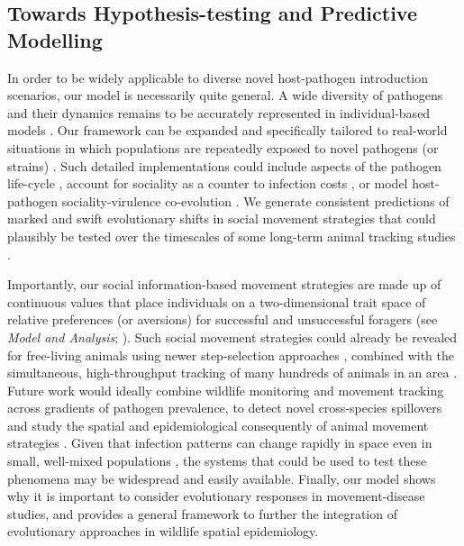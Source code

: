 \subsection*{Towards Hypothesis-testing and Predictive Modelling}

In order to be widely applicable to diverse novel host-pathogen introduction scenarios, our model is necessarily quite general.
A wide diversity of pathogens and their dynamics remains to be accurately represented in individual-based models \autocite{white2017,white2018,scherer2020,lunn2021}. 
Our framework can be expanded and specifically tailored to real-world situations in which populations are repeatedly exposed to novel pathogens (or strains) \autocite{scherer2020,wille2022,bastos2000,jolles2021,chandler2021,kuchipudi2022}.
Such detailed implementations could include aspects of the pathogen life-cycle \autocite{white2018a,white2017}, account for sociality as a counter to infection costs \autocite{ezenwa2016,almberg2015}, or model host-pathogen sociality-virulence co-evolution \autocite{ashby2022,prado2009,bonds2005}.
We generate consistent predictions of marked and swift evolutionary shifts in social movement strategies that could plausibly be tested over the timescales of some long-term animal tracking studies \citep{wilber2022}.

Importantly, our social information-based movement strategies are made up of continuous values that place individuals on a two-dimensional trait space of relative preferences (or aversions) for successful and unsuccessful foragers (see \textit{Model and Analysis}; \cite{bastille-rousseau2019}).
Such social movement strategies could already be revealed for free-living animals using newer step-selection approaches \citep{avgar2016}, combined with the simultaneous, high-throughput tracking of many hundreds of animals in an area \citep{nathan2022}.
Future work would ideally combine wildlife monitoring and movement tracking across gradients of pathogen prevalence, to detect novel cross-species spillovers \autocite{chandler2021,kuchipudi2022} and study the spatial and epidemiological consequently of animal movement strategies \autocite{bastille-rousseau2019,wilber2022,monk2022}.
Given that infection patterns can change rapidly in space even in small, well-mixed populations \citep{albery2022}, the systems that could be used to test these phenomena may be widespread and easily available.
Finally, our model shows why it is important to consider evolutionary responses in movement-disease studies, and provides a general framework to further the integration of evolutionary approaches in wildlife spatial epidemiology.

